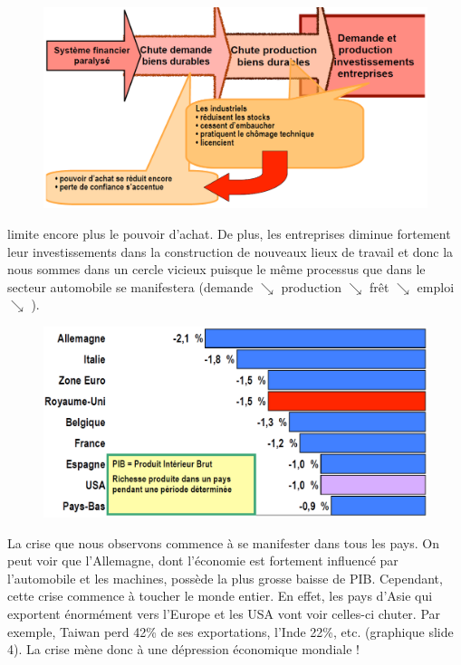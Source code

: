 \begin{figure}
	\includegraphics[scale=0.3]{18}
\end{figure}
\noindent limite encore plus le pouvoir d'achat. De plus, les entreprises diminue fortement leur investissements dans la construction de nouveaux lieux de travail et donc la nous sommes dans un cercle vicieux puisque le même processus que dans le secteur automobile se manifestera (demande $\searrow$ production $\searrow$ frêt $\searrow$ emploi $\searrow$ ).
\\

\begin{figure}
	\includegraphics[scale=0.3]{19}
\end{figure}
\noindent La crise que nous observons commence à se manifester dans tous les pays. On peut voir que l'Allemagne, dont l'économie est fortement influencé par l'automobile et les machines, possède la plus grosse baisse de PIB. Cependant, cette crise commence à toucher le monde entier. En effet, les pays d'Asie qui exportent énormément vers l'Europe et les USA vont voir celles-ci chuter. Par exemple, Taiwan perd 42\% de ses exportations, l'Inde 22\%, etc. (graphique slide 4). La crise mène donc à une dépression économique mondiale !
 
